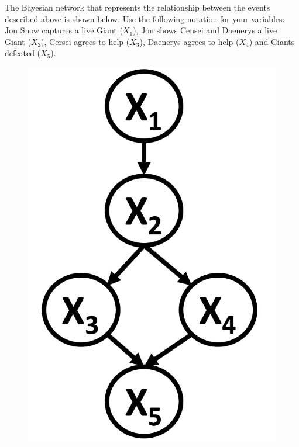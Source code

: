 \documentclass[12pt]{article}
\begin{document}
The Bayesian network that represents the relationship between the events described above is shown below. Use the following notation for your variables: Jon Snow captures a live Giant ($X_1$), Jon shows Censei and Daenerys a live Giant  ($X_2$), Cersei agrees to help ($X_3$), Daenerys agrees to help ($X_4$) and Giants defeated ($X_5$).
\begin{figure}[!hbtp]
\centering
\includegraphics[scale=0.3]{figures/q2.png}
\end{figure}
\end{document}
